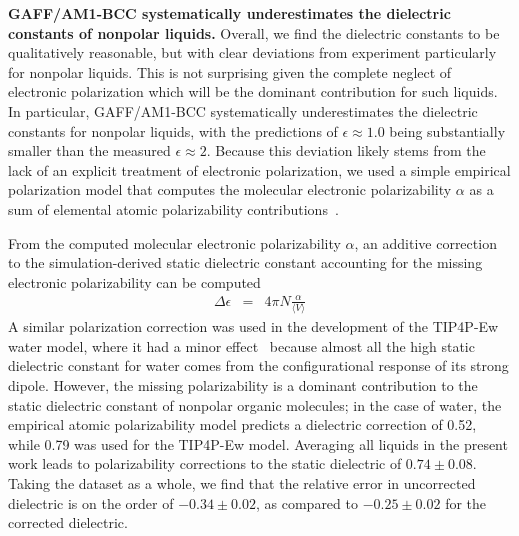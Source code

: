 \documentclass[aip, jcp, reprint]{revtex4-1}  %
\begin{document}

{\bf GAFF/AM1-BCC systematically underestimates the dielectric constants of nonpolar liquids.}
Overall, we find the dielectric constants to be qualitatively reasonable, but with clear deviations from experiment particularly for nonpolar liquids. 
This is not surprising given the complete neglect of electronic polarization which will be the dominant contribution for such liquids.
In particular, GAFF/AM1-BCC systematically underestimates the dielectric constants for nonpolar liquids, with the predictions of $\epsilon \approx 1.0 $ being substantially smaller than the measured $\epsilon \approx 2$.  
Because this deviation likely stems from the lack of an explicit treatment of electronic polarization, we used a simple empirical polarization model that computes the molecular electronic polarizability $\alpha$ as a sum of elemental atomic polarizability contributions~\cite{bosque2002polarizabilities}.


From the computed molecular electronic polarizability $\alpha$, an additive correction to the simulation-derived static dielectric constant accounting for the missing electronic polarizability can be computed~\cite{horn2004}
\begin{eqnarray}
\Delta \epsilon &=& 4 \pi N  \frac{\alpha}{\langle V \rangle} \label{equation:dielectric correction}
\end{eqnarray}
A similar polarization correction was used in the development of the TIP4P-Ew water model, where it had a minor effect~\cite{horn2004} because almost all the high static dielectric constant for water comes from the configurational response of its strong dipole.  
However, the missing polarizability is a dominant contribution to the static dielectric constant of nonpolar organic molecules;   
in the case of water, the empirical atomic polarizability model predicts a dielectric correction of 0.52, while 0.79 was used for the TIP4P-Ew model.  
Averaging all liquids in the present work leads to polarizability corrections to the static dielectric of $0.74 \pm 0.08$.
Taking the dataset as a whole, we find that the relative error in uncorrected dielectric is on the order of $-0.34 \pm 0.02$, as compared to $-0.25 \pm 0.02$ for the corrected dielectric.
\end{document}
